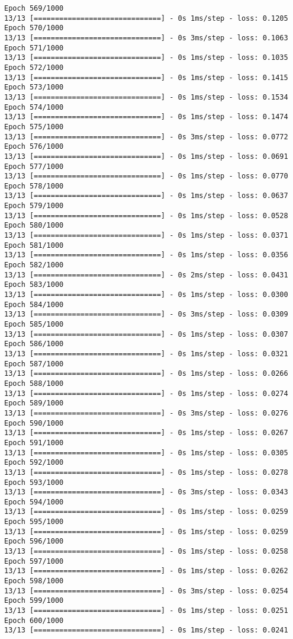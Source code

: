 \documentclass[11pt]{article}
\begin{document}
\begin{Verbatim}[commandchars=\\\{\}]
Epoch 569/1000
13/13 [==============================] - 0s 1ms/step - loss: 0.1205
Epoch 570/1000
13/13 [==============================] - 0s 3ms/step - loss: 0.1063
Epoch 571/1000
13/13 [==============================] - 0s 1ms/step - loss: 0.1035
Epoch 572/1000
13/13 [==============================] - 0s 1ms/step - loss: 0.1415
Epoch 573/1000
13/13 [==============================] - 0s 1ms/step - loss: 0.1534
Epoch 574/1000
13/13 [==============================] - 0s 1ms/step - loss: 0.1474
Epoch 575/1000
13/13 [==============================] - 0s 3ms/step - loss: 0.0772
Epoch 576/1000
13/13 [==============================] - 0s 1ms/step - loss: 0.0691
Epoch 577/1000
13/13 [==============================] - 0s 1ms/step - loss: 0.0770
Epoch 578/1000
13/13 [==============================] - 0s 1ms/step - loss: 0.0637
Epoch 579/1000
13/13 [==============================] - 0s 1ms/step - loss: 0.0528
Epoch 580/1000
13/13 [==============================] - 0s 1ms/step - loss: 0.0371
Epoch 581/1000
13/13 [==============================] - 0s 1ms/step - loss: 0.0356
Epoch 582/1000
13/13 [==============================] - 0s 2ms/step - loss: 0.0431
Epoch 583/1000
13/13 [==============================] - 0s 1ms/step - loss: 0.0300
Epoch 584/1000
13/13 [==============================] - 0s 3ms/step - loss: 0.0309
Epoch 585/1000
13/13 [==============================] - 0s 1ms/step - loss: 0.0307
Epoch 586/1000
13/13 [==============================] - 0s 1ms/step - loss: 0.0321
Epoch 587/1000
13/13 [==============================] - 0s 1ms/step - loss: 0.0266
Epoch 588/1000
13/13 [==============================] - 0s 1ms/step - loss: 0.0274
Epoch 589/1000
13/13 [==============================] - 0s 3ms/step - loss: 0.0276
Epoch 590/1000
13/13 [==============================] - 0s 1ms/step - loss: 0.0267
Epoch 591/1000
13/13 [==============================] - 0s 1ms/step - loss: 0.0305
Epoch 592/1000
13/13 [==============================] - 0s 1ms/step - loss: 0.0278
Epoch 593/1000
13/13 [==============================] - 0s 3ms/step - loss: 0.0343
Epoch 594/1000
13/13 [==============================] - 0s 1ms/step - loss: 0.0259
Epoch 595/1000
13/13 [==============================] - 0s 1ms/step - loss: 0.0259
Epoch 596/1000
13/13 [==============================] - 0s 1ms/step - loss: 0.0258
Epoch 597/1000
13/13 [==============================] - 0s 1ms/step - loss: 0.0262
Epoch 598/1000
13/13 [==============================] - 0s 3ms/step - loss: 0.0254
Epoch 599/1000
13/13 [==============================] - 0s 1ms/step - loss: 0.0251
Epoch 600/1000
13/13 [==============================] - 0s 1ms/step - loss: 0.0241

\end{Verbatim}
\end{document}

